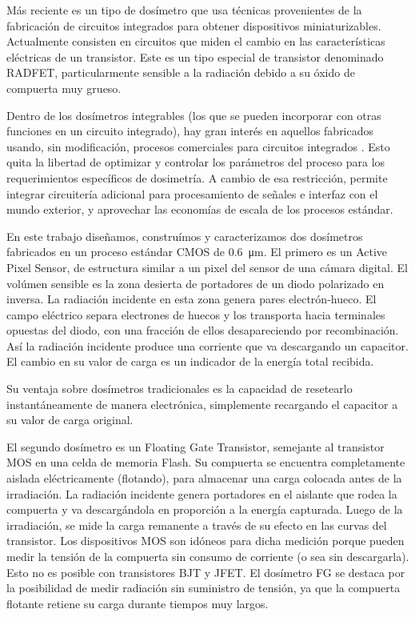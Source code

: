 Más reciente es un tipo de dosímetro que usa técnicas 
provenientes de la fabricación de circuitos integrados 
para obtener dispositivos 
miniaturizables\cite{holmes-siedle_radfet:_1986}.
Actualmente consisten en circuitos que miden el 
cambio en las características eléctricas de un transistor.
Este es un tipo especial de transistor denominado RADFET,
particularmente sensible a la radiación 
debido a su óxido de compuerta muy grueso.

Dentro de los dosímetros integrables 
(los que se pueden incorporar con otras funciones en un circuito integrado),
hay gran interés en aquellos fabricados usando, sin modificación,
procesos comerciales para circuitos integrados\cite{lipovetzky_field_2013}
\cite{wang_temperature_2005}
\cite{garcia-moreno_floating_2012}
\cite{dulinski_cmos_2004}.
Esto quita la libertad de optimizar y controlar 
los parámetros del proceso 
para los requerimientos específicos de dosimetría.
A cambio de esa restricción, 
permite integrar circuitería adicional
para procesamiento de señales e interfaz con el mundo exterior,
y aprovechar las economías de escala de los procesos estándar.

En este trabajo diseñamos, construímos y caracterizamos
dos dosímetros fabricados en un proceso estándar CMOS de
\SI{0.6}{\micro\meter}.
El primero es un Active Pixel Sensor,
de estructura similar a un pixel del sensor de una cámara digital.
El volúmen sensible es la zona desierta de portadores 
de un diodo polarizado en inversa.
La radiación incidente en esta zona genera pares electrón-hueco.
El campo eléctrico separa electrones de huecos y los transporta hacia
terminales opuestas del diodo,
con una fracción de ellos desapareciendo por recombinación.
Así la radiación incidente produce una corriente que va
descargando un capacitor.
El cambio en su valor de carga es un indicador de la energía total recibida.

Su ventaja sobre dosímetros tradicionales es la capacidad de resetearlo
instantáneamente de manera electrónica,
simplemente recargando el capacitor a su valor de carga original.

El segundo dosímetro es un Floating Gate Transistor,
semejante al transistor MOS en una celda de memoria Flash.
Su compuerta se encuentra completamente aislada eléctricamente (flotando),
para almacenar una carga colocada antes de la irradiación.
La radiación incidente genera portadores en el aislante que rodea la compuerta
y va descargándola en proporción a la energía capturada.
Luego de la irradiación,
se mide la carga remanente a través de su efecto en las curvas del transistor.
Los dispositivos MOS son idóneos para dicha medición
porque pueden medir la tensión de la compuerta sin consumo de corriente
(o sea sin descargarla).
Esto no es posible con transistores BJT y JFET.
El dosímetro FG se destaca por la posibilidad de medir radiación sin suministro
de tensión, ya que la compuerta flotante retiene su carga durante tiempos muy
largos.

